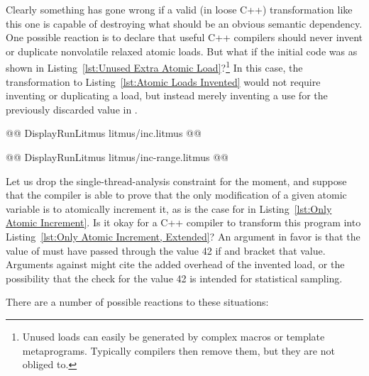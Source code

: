 \documentclass[10]{article}
\begin{document}
Clearly something has gone wrong if a valid (in loose C++) transformation
like this one is capable of destroying what should be an obvious semantic
dependency.
One possible reaction is to declare that useful C++ compilers should never
invent or duplicate nonvolatile relaxed atomic loads.
But what if the initial code was as shown in
Listing~\ref{lst:Unused Extra Atomic Load}?\footnote{
	Unused loads can easily be generated by complex macros or
	template metaprograms.
	Typically compilers then remove them, but they are not obliged to.}
In this case, the transformation to
Listing~\ref{lst:Atomic Loads Invented}
would not require inventing or duplicating a load,
but instead merely inventing a use for
the previously discarded value in .

\begin{listing}[tbp]
@@ DisplayRunLitmus litmus/inc.litmus @@
\caption{Only Atomic Increment}
\label{lst:Only Atomic Increment}
\end{listing}

\begin{listing}[tbp]
@@ DisplayRunLitmus litmus/inc-range.litmus @@
\caption{Only Atomic Increment, Extended}
\label{lst:Only Atomic Increment, Extended}
\end{listing}

Let us drop the single-thread-analysis constraint for
the moment, and suppose that the compiler is able to prove
that the only modification of a given atomic variable is to atomically
increment it, as is the case for  in
Listing~\ref{lst:Only Atomic Increment}.
Is it okay for a C++ compiler to transform this program into
Listing~\ref{lst:Only Atomic Increment, Extended}?
An argument in favor is that the value of  must have
passed through the value 42 if  and 
bracket that value.
Arguments against might cite the added overhead of the invented load,
or the possibility that the check for the value 42 is intended for statistical
sampling.

There are a number of possible reactions to these situations:
\end{document}
